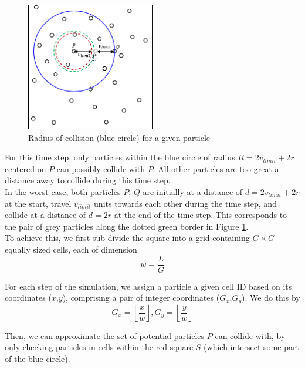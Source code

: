 \documentclass[12pt]{article}
\begin{document}
\begin{figure}[H]
    \centering
    \includegraphics[width=0.5\textwidth]{./reportAssets/chap8RadOfCollision}
    \caption{Radius of collision (blue circle) for a given particle}
    \label{fig:chap8RadOfCollision}
\end{figure}

For this time step, only particles within the blue circle of radius $R=2v_{limit}+2r$ centered on $P$ can possibly collide with $P$. All other particles are too great a distance away to collide during this time step. \\

In the worst case, both particles $P$, $Q$ are initially at a distance of $d=2v_{limit}+2r$ at the start, travel $v_{limit}$ units towards each other during the time step, and collide at a distance of $d=2r$ at the end of the time step. This corresponds to the pair of grey particles along the dotted green border in Figure \ref{fig:chap8RadOfCollision}. \\

To achieve this, we first sub-divide the square into a grid containing $G \times G$ equally sized cells, each of dimension
$$w = \frac{L}{G}$$

For each step of the simulation, we assign a particle a given cell ID based on its coordinates ($x$,$y$), comprising a pair of integer coordinates ($G_x$,$G_y$). We do this by
$$G_x = \left\lfloor{\frac{x}{w}}\right\rfloor, G_y = \left\lfloor{\frac{y}{w}}\right\rfloor$$

Then, we can approximate the set of potential particles $P$ can collide with, by only checking particles in cells within the red square $S$ (which intersect some part of the blue circle). \\
\end{document}
